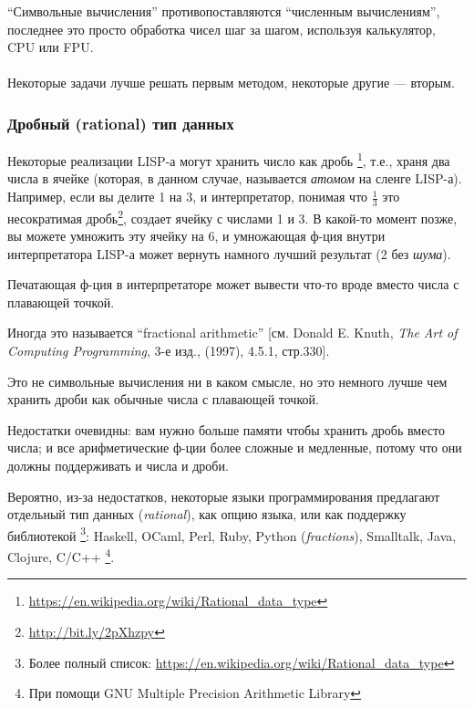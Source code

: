``Символьные вычисления'' противопоставляются ``численным вычислениям'', последнее это просто обработка чисел шаг за шагом,
используя калькулятор, \ac{CPU} или \ac{FPU}.\\
\\
Некоторые задачи лучше решать первым методом, некоторые другие --- вторым.

\subsubsection{Дробный (rational) тип данных}

Некоторые реализации LISP-а могут хранить число как дробь
\footnote{\url{https://en.wikipedia.org/wiki/Rational_data_type}}, т.е., храня два числа в ячейке (которая, в данном случае, называется \textit{атомом} на сленге LISP-а).
Например, если вы делите 1 на 3, и интерпретатор, понимая что $\frac{1}{3}$ это
несократимая дробь\footnote{\url{http://bit.ly/2pXhzpy}}, создает ячейку с числами 1 и 3.
В какой-то момент позже, вы можете умножить эту ячейку на 6, и умножающая ф-ция внутри интерпретатора LISP-а может вернуть
намного лучший результат (2 без \textit{шума}).

Печатающая ф-ция в интерпретаторе может вывести что-то вроде  вместо числа с плавающей точкой.

Иногда это называется ``fractional arithmetic'' [см. Donald E. Knuth, \textit{The Art of Computing Programming}, 3-е изд., (1997), 4.5.1, стр.330].

Это не символьные вычисления ни в каком смысле, но это немного лучше чем хранить дроби как обычные числа с плавающей точкой.

Недостатки очевидны: вам нужно больше памяти чтобы хранить дробь вместо числа;
и все арифметические ф-ции более сложные и медленные, потому что они должны поддерживать и числа и дроби.

Вероятно, из-за недостатков, некоторые языки программирования предлагают отдельный тип данных (\textit{rational}),
как опцию языка, или как поддержку библиотекой
\footnote{Более полный список: \url{https://en.wikipedia.org/wiki/Rational_data_type}}:
Haskell, OCaml, Perl, Ruby, Python (\textit{fractions}), Smalltalk, Java, Clojure, C/C++
\footnote{При помощи GNU Multiple Precision Arithmetic Library}.

